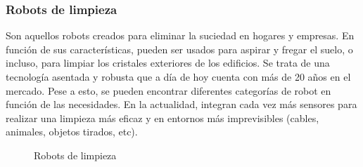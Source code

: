 \subsubsection{Robots de limpieza}
Son aquellos robots creados para eliminar la suciedad en hogares y empresas. En función de sus características, pueden ser usados para aspirar y fregar el suelo, o incluso,
para limpiar los cristales exteriores de los edificios. Se trata de una tecnología asentada y robusta que a día de hoy cuenta con más de 20 años en el mercado. Pese a esto, 
se pueden encontrar diferentes categorías de robot en función de las necesidades. En la actualidad, integran cada vez más sensores para realizar una limpieza más eficaz y 
en entornos más imprevisibles (cables, animales, objetos tirados, etc).

\begin{figure} [ht!]
  \centering    
  \hspace{1cm}
  \hspace{1cm}
  \caption{Robots de limpieza}
\end{figure}

